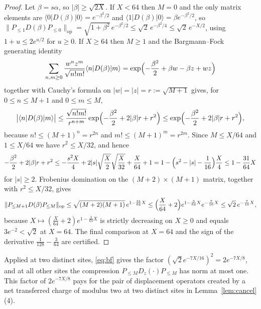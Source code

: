 \documentclass[11pt]{article}
\theoremstyle{plain}
\theoremstyle{definition}
\begin{document}
\begin{proof}
Let $\beta=s\alpha$, so $|\beta|\ge\sqrt{2X}$. If $X<64$ then $M=0$ and the only
matrix elements are $\langle0|D(\beta)|0\rangle=e^{-\beta^{2}/2}$ and
$\langle1|D(\beta)|0\rangle=\beta e^{-\beta^{2}/2}$, so
$\|P_{\le1}D(\beta)P_{\le0}\|_{\mathrm{op}}=\sqrt{1+\beta^{2}}\,e^{-\beta^{2}/2}
\le\sqrt2\,e^{-\beta^{2}/4}\le\sqrt2\,e^{-X/2}$, using $1+u\le2e^{u/2}$ for $u\ge0$.
If $X\ge64$ then $M\ge1$ and the Bargmann--Fock generating identity
\begin{equation}\label{eq:bfgen}
\sum_{n,m\ge0}\frac{w^{n}z^{m}}{\sqrt{n!m!}}\langle n|D(\beta)|m\rangle
=\exp\Bigl(-\frac{\beta^{2}}{2}+\beta w-\beta z+wz\Bigr)
\end{equation}
together with Cauchy's formula on $|w|=|z|=r:=\sqrt{M+1}$ gives, for
$0\le n\le M+1$ and $0\le m\le M$,
\begin{equation}\label{eq:bfentry}
\bigl|\langle n|D(\beta)|m\rangle\bigr|
\le\frac{\sqrt{n!m!}}{r^{n+m}}\exp\Bigl(-\frac{\beta^{2}}{2}+2|\beta|r+r^{2}\Bigr)
\le\exp\Bigl(-\frac{\beta^{2}}{2}+2|\beta|r+r^{2}\Bigr),
\end{equation}
because $n!\le(M+1)^{n}=r^{2n}$ and $m!\le(M+1)^{m}=r^{2m}$. Since $M\le X/64$ and
$1\le X/64$ we have $r^{2}\le X/32$, and hence
\begin{equation}\label{eq:bfexp}
-\frac{\beta^{2}}{2}+2|\beta|r+r^{2}
\le-\frac{s^{2}X}{4}+2|s|\sqrt{\frac X2}\sqrt{\frac X{32}}+\frac X{64}+1
=1-\Bigl(s^{2}-|s|-\frac1{16}\Bigr)\frac X4\le1-\frac{31}{64}X
\end{equation}
for $|s|\ge2$. Frobenius domination on the $(M+2)\times(M+1)$ matrix, together
with $r^{2}\le X/32$, gives
\begin{equation}\label{eq:bfdir}
\|P_{\le M+1}D(\beta)P_{\le M}\|_{\mathrm{op}}
\le\sqrt{(M+2)(M+1)}\,e^{1-\frac{31}{64}X}
\le\Bigl(\frac X{64}+2\Bigr)e^{1-\frac{3}{64}X}e^{-\frac{7}{16}X}\le\sqrt2\,e^{-\frac{7}{16}X},
\end{equation}
because $X\mapsto(\frac X{64}+2)e^{1-\frac{3}{64}X}$ is strictly decreasing on
$X\ge0$ and equals $3e^{-2}<\sqrt2$ at $X=64$. The final comparison at
$X=64$ and the sign of the derivative $\frac1{128}-\frac3{64}$ are certified.
\end{proof}

Applied at two distinct sites, \eqref{eq:bf} gives the factor
$(\sqrt2e^{-7X/16})^{2}=2e^{-7X/8}$, and at all other sites the compression
$P_{\le M}D_z(\cdot)P_{\le M}$ has norm at most one. This factor of
$2e^{-7X/8}$ pays for the pair of displacement operators created by a net
transferred charge of modulus two at two distinct sites in
Lemma~\ref{lem:cancel}(4).
\end{document}
